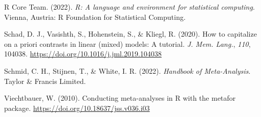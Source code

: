 \documentclass[
  man,floatsintext]{apa6}
\newlength{\cslhangindent}
\newlength{\cslentryspacingunit} %
\newenvironment{CSLReferences}[2] %
 {%
  \setlength{\parindent}{0pt}
  \ifodd #1
  \let\oldpar\par
  \def\par{\hangindent=\cslhangindent\oldpar}
  \fi
  \setlength{\parskip}{#2\cslentryspacingunit}
 }%
 {}
\begin{document}
\begin{CSLReferences}{1}{0}
\leavevmode{}%
R Core Team. (2022). \emph{R: A language and environment for statistical computing}. Vienna, Austria: R Foundation for Statistical Computing.

\leavevmode{}%
Schad, D. J., Vasishth, S., Hohenstein, S., \& Kliegl, R. (2020). How to capitalize on a priori contrasts in linear (mixed) models: A tutorial. \emph{J. Mem. Lang.}, \emph{110}, 104038. \url{https://doi.org/10.1016/j.jml.2019.104038}

\leavevmode{}%
Schmid, C. H., Stijnen, T., \& White, I. R. (2022). \emph{Handbook of {Meta-Analysis}}. Taylor \& Francis Limited.

\leavevmode{}%
Viechtbauer, W. (2010). Conducting meta-analyses in {R} with the {metafor} package. \url{https://doi.org/10.18637/jss.v036.i03}

\end{CSLReferences}
\end{document}
